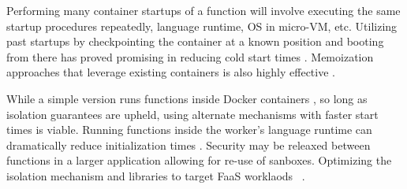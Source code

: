 Performing many container startups of a function will involve executing the same startup procedures repeatedly, language runtime, OS in micro-VM, etc.
Utilizing past startups by checkpointing the container at a known position and booting from there has proved promising in reducing cold start times \cite{du2020catalyzer,vhive-asplos21}.
Memoization approaches that leverage existing containers is also highly effective \cite{du2020catalyzer,wei2022booting}.

While a simple version runs functions inside Docker containers \cite{docker-main}, so long as isolation guarantees are upheld, using alternate mechanisms with faster start times is viable.
Running functions inside the worker's language runtime can dramatically reduce initialization times \cite{vhive-asplos21,shillaker2020faasm,jia2021nightcore,du2020catalyzer}.
Security may be releaxed between functions in a larger application \cite{akkus_sand_2018, dukic2020photons} allowing for re-use of sanboxes.
Optimizing the isolation mechanism and libraries to target FaaS worklaods ~\cite{firecracker-nsdi20, carreira2021warm}. 
%

